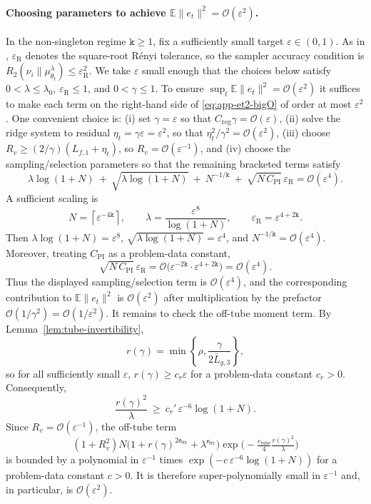 \documentclass{article}
\theoremstyle{normaltheorem}
\newcommand{\gibbs}{\mu}
\newcommand{\dimk}{\texttt{k}}
\begin{document}
\paragraph{Choosing parameters to achieve $\mathbb E\|e_t\|^2=\mathcal{O}(\varepsilon^2)$.}
In the non-singleton regime \(\dimk\ge1\), fix a sufficiently small target $\varepsilon\in(0,1)$.
As in , \(\varepsilon_{\mathrm R}\) denotes the square-root R\'enyi tolerance, so the sampler accuracy condition is \(R_2(\nu_i\|\gibbs_{\theta_t}^\lambda)\le \varepsilon_{\mathrm R}^2\).
We take \(\varepsilon\) small enough that the choices below satisfy \(0<\lambda\le\lambda_0\), \(\varepsilon_{\mathrm R}\le1\), and \(0<\gamma\le1\).
To ensure $\sup_t\mathbb E\|e_t\|^2=\mathcal{O}(\varepsilon^2)$ it suffices to make each term on the right-hand side of \eqref{eq:app-et2-bigO} of order at most $\varepsilon^2$.
One convenient choice is:
(i) set $\gamma=\varepsilon$ so that $C_{\mathrm{reg}}\gamma=\mathcal{O}(\varepsilon)$,
(ii) solve the ridge system to residual $\eta_t=\gamma\varepsilon=\varepsilon^2$, so that \(\eta_t^2/\gamma^2=\mathcal{O}(\varepsilon^2)\),
(iii) choose \(R_v\ge (2/\gamma)(L_{f,1}+\eta_t)\), so \(R_v=\mathcal{O}(\varepsilon^{-1})\), and
(iv) choose the sampling/selection parameters so that the remaining bracketed terms satisfy
\[
\lambda\log(1+N)
\ +\ \sqrt{\lambda\log(1+N)}
\ +\ N^{-1/\dimk}
\ +\ \sqrt{N\,C_{\mathrm{PI}}}\,\varepsilon_{\mathrm R}
= \mathcal{O}(\varepsilon^4).
\]
A sufficient scaling is
\[
N=\left\lceil\varepsilon^{-4\dimk}\right\rceil,
\qquad
\lambda=\frac{\varepsilon^{8}}{\log(1+N)},
\qquad
\varepsilon_{\mathrm R}=\varepsilon^{4+2\dimk}.
\]
Then $\lambda\log(1+N)=\varepsilon^{8}$, $\sqrt{\lambda\log(1+N)}=\varepsilon^{4}$, and $N^{-1/\dimk}=\mathcal{O}(\varepsilon^{4})$.
Moreover, treating \(C_{\mathrm{PI}}\) as a problem-data constant,
\[
\sqrt{N\,C_{\mathrm{PI}}}\,\varepsilon_{\mathrm R}
=
\mathcal{O}\!\Big(\varepsilon^{-2\dimk}\cdot \varepsilon^{4+2\dimk}\Big)
=
\mathcal{O}(\varepsilon^{4}).
\]
Thus the displayed sampling/selection term is $\mathcal{O}(\varepsilon^4)$, and the corresponding contribution to
$\mathbb E\|e_t\|^2$ is $\mathcal{O}(\varepsilon^2)$ after multiplication by the prefactor $\mathcal{O}(1/\gamma^2)=\mathcal{O}(1/\varepsilon^2)$.
It remains to check the off-tube moment term. By Lemma~\ref{lem:tube-invertibility},
\[
r(\gamma)=\min\left\{\rho,\frac{\gamma}{2\bar L_{g,3}}\right\},
\]
so for all sufficiently small \(\varepsilon\), \(r(\gamma)\ge c_r\varepsilon\) for a problem-data constant \(c_r>0\).
Consequently,
\[
\frac{r(\gamma)^2}{\lambda}
\ \ge\
c_r'\,\varepsilon^{-6}\log(1+N).
\]
Since \(R_v=\mathcal{O}(\varepsilon^{-1})\), the off-tube term
\[
(1+R_v^2)N
\big(1+r(\gamma)^{2\mathsf n_{\theta x}}+\lambda^{\mathsf n_{\theta x}}\big)
\exp\!\Big(-\tfrac{c_{\mathrm{tube}}}{4}\tfrac{r(\gamma)^2}{\lambda}\Big)
\]
is bounded by a polynomial in \(\varepsilon^{-1}\) times
\(\exp(-c\,\varepsilon^{-6}\log(1+N))\) for a problem-data constant \(c>0\).
It is therefore super-polynomially small in \(\varepsilon^{-1}\) and, in particular, is \(\mathcal{O}(\varepsilon^2)\).
\end{document}
